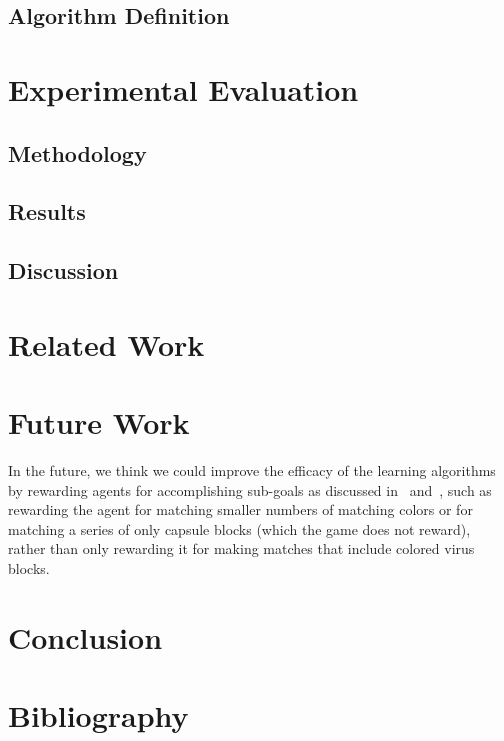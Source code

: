 \documentclass[letterpaper]{article} %
\begin{document}
\subsection{Algorithm Definition}

\section{Experimental Evaluation}
\subsection{Methodology}

\subsection{Results}

\subsection{Discussion}

\section{Related Work}

\section{Future Work}
In the future, we think we could improve the efficacy of the learning algorithms by rewarding agents for accomplishing sub-goals as discussed in~\cite{banzas15} and~\cite{bhonker17}, such as rewarding the agent for matching smaller numbers of matching colors or for matching a series of only capsule blocks (which the game does not reward), rather than only rewarding it for making matches that include colored virus blocks.

\section{Conclusion}

\newpage
\section{Bibliography}


\end{document}
